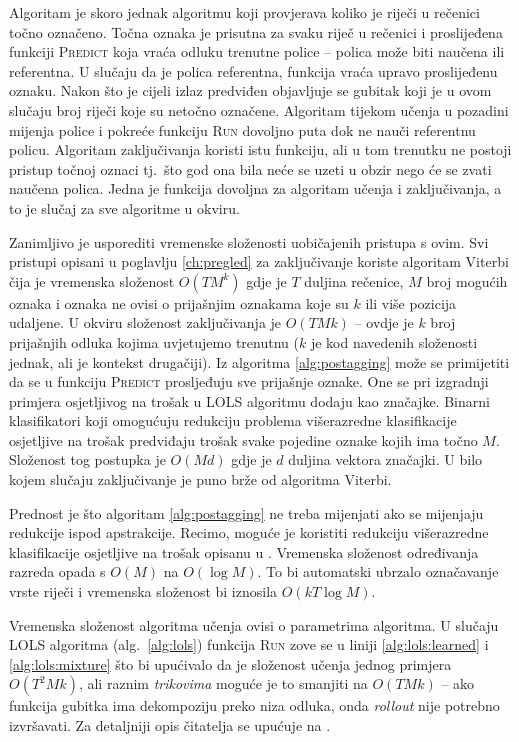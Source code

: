 Algoritam je skoro jednak algoritmu koji provjerava koliko je riječi u rečenici
točno označeno. Točna oznaka je prisutna za svaku riječ u rečenici i proslijeđena
funkciji \textsc{Predict} koja vraća odluku trenutne police -- polica može biti
naučena ili referentna. U slučaju da je polica referentna, funkcija vraća upravo
proslijeđenu oznaku. Nakon što je cijeli izlaz predviđen objavljuje se gubitak
koji je u ovom slučaju broj riječi koje su netočno označene. Algoritam tijekom
učenja u pozadini mijenja police i pokreće funkciju \textsc{Run} dovoljno puta
dok ne nauči referentnu policu. Algoritam zaključivanja koristi istu funkciju,
ali u tom trenutku ne postoji pristup točnoj oznaci tj.~što god ona bila neće se
uzeti u obzir nego će se zvati naučena polica. Jedna je funkcija dovoljna za
algoritam učenja i zaključivanja, a to je slučaj za sve algoritme u \lts{}
okviru.

Zanimljivo je usporediti vremenske složenosti uobičajenih pristupa s ovim. Svi
pristupi opisani u poglavlju \ref{ch:pregled} za zaključivanje koriste algoritam
Viterbi čija je vremenska složenost $O(T M ^ k)$ gdje je $T$ duljina rečenice,
$M$ broj mogućih oznaka i oznaka ne ovisi o prijašnjim oznakama koje su $k$ ili
više pozicija udaljene. U \lts{} okviru složenost zaključivanja je $O(T M k)$ --
ovdje je $k$ broj prijašnjih odluka kojima uvjetujemo trenutnu ($k$ je kod
navedenih složenosti jednak, ali je kontekst drugačiji). Iz algoritma
\ref{alg:postagging} može se primijetiti da se u funkciju \textsc{Predict}
prosljeđuju sve prijašnje oznake. One se pri izgradnji primjera osjetljivog na
trošak u \textsc{LOLS} algoritmu dodaju kao značajke. Binarni klasifikatori koji
omogućuju redukciju problema višerazredne klasifikacije osjetljive na trošak
predviđaju trošak svake pojedine oznake kojih ima točno $M$. Složenost tog
postupka je $O(M d)$ gdje je $d$ duljina vektora značajki. U bilo kojem slučaju
zaključivanje je puno brže od algoritma Viterbi.

Prednost je što algoritam \ref{alg:postagging} ne treba mijenjati ako se
mijenjaju redukcije ispod apstrakcije. Recimo, moguće je koristiti redukciju
višerazredne klasifikacije osjetljive na trošak opisanu u
\citep{beygelzimer2009error, daume2016one}. Vremenska složenost određivanja
razreda opada s $O(M)$ na $O(\log M)$. To bi automatski ubrzalo označavanje
vrste riječi i vremenska složenost bi iznosila $O(k T \log M)$.

Vremenska složenost algoritma učenja ovisi o parametrima algoritma. U slučaju
\textsc{LOLS} algoritma (alg.~\ref{alg:lols}) funkcija \textsc{Run} zove se u
liniji \ref{alg:lols:learned} i \ref{alg:lols:mixture} što bi upućivalo da je
složenost učenja jednog primjera $O(T ^ 2 M k)$, ali raznim \textit{trikovima}
moguće je to smanjiti na $O(T M k)$ -- ako funkcija gubitka ima dekompoziju
preko niza odluka, onda \textit{rollout} nije potrebno izvršavati. Za detaljniji
opis čitatelja se upućuje na \citep{daume14lts}.

